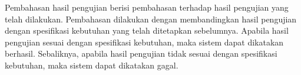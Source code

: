 Pembahasan hasil pengujian berisi pembahasan terhadap hasil pengujian yang telah dilakukan. Pembahasan dilakukan dengan membandingkan hasil pengujian dengan spesifikasi kebutuhan yang telah ditetapkan sebelumnya. Apabila hasil pengujian sesuai dengan spesifikasi kebutuhan, maka sistem dapat dikatakan berhasil. Sebaliknya, apabila hasil pengujian tidak sesuai dengan spesifikasi kebutuhan, maka sistem dapat dikatakan gagal.
